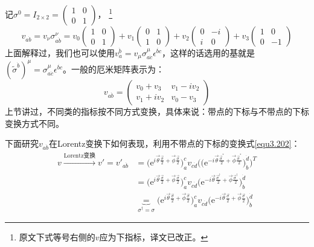 记$\sigma^0 = I_{2 \times 2} = \begin{pmatrix} 1 & 0 \\ 0 & 1 \end{pmatrix}$， \footnote{原文下式等号右侧的$v$应为下指标，译文已改正。}
\begin{equation}
\label{equ3.215}
	v_{a\dot{b}} = v_\nu \sigma^\nu_{a\dot{b}} = v_0 \begin{pmatrix} 1 & 0 \\ 0 & 1 \end{pmatrix} + v_1 \begin{pmatrix} 0 & 1 \\ 1 & 0 \end{pmatrix} + v_2 \begin{pmatrix} 0 & -i \\ i & 0 \end{pmatrix} + v_3 \begin{pmatrix} 1 & 0 \\ 0 & -1 \end{pmatrix}
\end{equation}
上面解释过，我们也可以使用$v^{\dot{b}}_a = v_\mu \sigma_{a \dot{c}}^\mu \epsilon^{\dot{bc}}$，这样的话选用的基就是$(\tilde{\sigma}^{\dot{b}})^\mu = \sigma_{a \dot{c}}^\mu \epsilon^{\dot{bc}}$。一般的厄米矩阵表示为：
\begin{equation}
\label{equ3.216}
	v_{a\dot{b}} =
		\begin{pmatrix}
			v_0 + v_3 & v_1 - i v_2 \\
			v_1 + i v_2 & v_0 - v_3
		\end{pmatrix}
\end{equation}
上节讲过，不同类的指标按不同方式变换，具体来说：带点的下标与不带点的下标变换方式不同。

下面研究$v_{a\dot{b}}$在Lorentz变换下如何表现，利用不带点的下标的变换式\ref{equ3.202}：
\begin{align}
	v \stackrel{\text{Lorentz变换}}{\longrightarrow} v' = v'_{a \dot{b}} &= \Big( \mathrm{e}^{ i \vec{\theta} \frac{ \vec{\sigma} }{2} + \vec{\phi} \frac{\vec{\sigma}}{2} } \Big)^c_a v_{c \dot{d}} \Bigg( \Big( \mathrm{e}^{ -i \vec{\theta} \frac{ \vec{\sigma}^* }{2} + \vec{\phi} \frac{ \vec{\sigma}^* }{2} } \Big)^{\dot{d}}_{\dot{b}} \Bigg)^T \nonumber \\
	&= \Big( \mathrm{e}^{ i \vec{\theta} \frac{ \vec{\sigma} }{2}  + \vec{\phi} \frac{\vec{\sigma}}{2}} \Big)^c_a v_{c \dot{d}} \bigg( \mathrm{e}^{ -i\vec{\theta} \frac{ \vec{\sigma}^\dag }{2} + \vec{\phi} \frac{ \vec{\sigma}^\dag }{2} } \bigg)^{\dot{d}}_{\dot{b}} \nonumber \\
\label{equ3.217}
	& \underbrace{=}_{\sigma^\dag = \sigma} \Big( \mathrm{e}^{ i \vec{\theta} \frac{ \vec{\sigma} }{2}  + \vec{\phi} \frac{\vec{\sigma}}{2}} \Big)^c_a v_{c \dot{d}} \Big(  \mathrm{e}^{ -i\vec{\theta} \frac{ \vec{\sigma} }{2} + \vec{\phi} \frac{ \vec{\sigma} }{2} } \Big)^{\dot{d}}_{\dot{b}}
\end{align}

